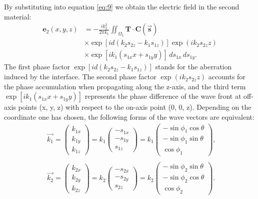 \documentclass[9pt,twocolumn,twoside]{osajnl}
\begin{document}
By substituting into equation \eqref{eq:9} we obtain the electric field in the second material:
\begin{equation}
	\begin{aligned}\label{eq:12}
	\mathbf{e}_2(x,y,z)&=-\frac{ik^2_2}{2\pi k_1}\iint_{\Omega_1}\mathbf{T}\cdot\mathbf{C}(\vec{\mathbf{s}})\\
	&\times\exp[id(k_2s_{2z}-k_1s_{1z})]\exp(ik_2s_{2z}z)\\
	&\times\exp[ik_1(s_{1x}x+s_{1y}y)]\,ds_{1x}\,ds_{1y}.
	\end{aligned}
\end{equation}
The first phase factor $\exp[id(k_2s_{2z}-k_1s_{1z})]$ stands for the aberration induced by the interface. The second phase factor $\exp(ik_2s_{2z}z)$ accounts for the phase accumulation when propagating along the z-axis, and the third term $\exp[ik_1(s_{1x}x+s_{1y}y)]$ represents the phase difference of the wave front at off-axis points (x, y, z) with respect to the on-axis point (0, 0, z).
Depending on the coordinate one has chosen, the following forms of the wave vectors are equivalent:
\begin{equation}\label{eq:13}
	\begin{aligned}
		&\vec{k_1}=\begin{pmatrix}
			k_{1x}\\
			k_{1y}\\
			k_{1z}
		\end{pmatrix}=k_1	
		\begin{pmatrix}
			-s_{1x}\\
			-s_{1y}\\
			s_{1z}	
		\end{pmatrix}=k_1
		\begin{pmatrix}
			-\sin\phi_1\cos\theta\\
			-\sin\phi_1\sin\theta\\
			\cos\phi_1	
		\end{pmatrix},\,\,\\\\
	&\vec{k_2}=\begin{pmatrix}
		k_{2x}\\
		k_{2y}\\
		k_{2z}
	\end{pmatrix}=k_2	
		\begin{pmatrix}
			-s_{2x}\\
			-s_{2y}\\
			s_{2z}	
		\end{pmatrix}=k_2
		\begin{pmatrix}
			-\sin\phi_2\sin\theta\\
			-\sin\phi_2\cos\theta\\
			\cos\phi_2	
		\end{pmatrix}.		
	\end{aligned}
\end{equation}
\end{document}
